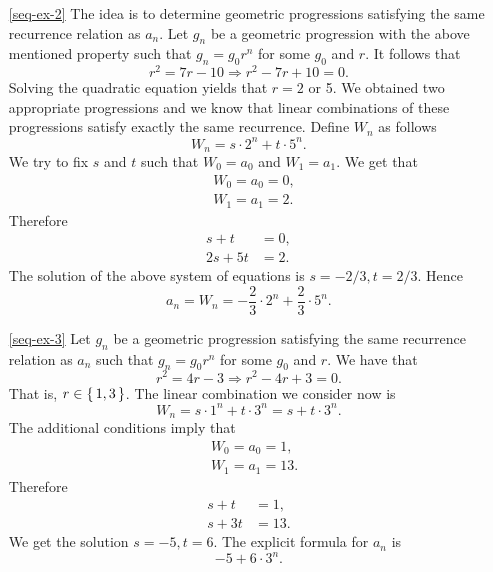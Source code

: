\begin{enumerate}
\item[\ref{seq-ex-2}]
The idea is to determine geometric progressions satisfying the same recurrence relation as $a_n$.
Let $g_n$ be a geometric progression with the above mentioned property such that $g_n=g_0r^n$ for some $g_0$ and $r$.
It follows that
$$
r^2=7r-10\Rightarrow r^2-7r+10=0.
$$
Solving the quadratic equation yields that $r=2$ or 5. We obtained two appropriate progressions and we know that linear combinations
of these progressions satisfy exactly the same recurrence. Define $W_n$ as follows
$$
W_n=s\cdot 2^n+t\cdot 5^n.
$$
We try to fix $s$ and $t$ such that $W_0=a_0$ and $W_1=a_1$. We get that
\begin{align*}
&W_0=a_0=0,\\
&W_1=a_1=2.
\end{align*}
Therefore
\begin{align*}
s+t&=0,\\
2s+5t&=2.
\end{align*}
The solution of the above system of equations is $s=-2/3, t=2/3$.
Hence
$$
a_n=W_n=-\frac{2}{3}\cdot 2^n+\frac{2}{3}\cdot 5^n.
$$

\item[\ref{seq-ex-3}]
Let $g_n$ be a geometric progression satisfying the same recurrence relation as $a_n$ such that $g_n=g_0r^n$ for some $g_0$ and $r$.
We have that 
$$
r^2=4r-3\Rightarrow r^2-4r+3=0.
$$
That is, $r\in\left\{\,1,3\,\right\}$. The linear combination we consider now is
$$
W_n=s\cdot 1^n+t\cdot 3^n=s+t\cdot 3^n.
$$
The additional conditions imply that
\begin{align*}
&W_0=a_0=1,\\
&W_1=a_1=13.
\end{align*}
Therefore
\begin{align*}
s+t&=1,\\
s+3t&=13.
\end{align*}
We get the solution $s=-5,t=6$. The explicit formula for $a_n$ is
$$
-5+6\cdot 3^n.
$$


\end{enumerate}
